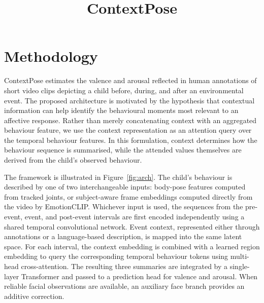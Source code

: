 \documentclass[11pt]{article}
\title{ContextPose}
\author{}
\date{}
\begin{document}
\maketitle

\section{Methodology}
\label{sec:method}

ContextPose estimates the valence and arousal reflected in human annotations of short video clips depicting a child before, during, and after an environmental event. The proposed architecture is motivated by the hypothesis that contextual information can help identify the behavioural moments most relevant to an affective response. Rather than merely concatenating context with an aggregated behaviour feature, we use the context representation as an attention query over the temporal behaviour features. In this formulation, context determines how the behaviour sequence is summarised, while the attended values themselves are derived from the child's observed behaviour.

The framework is illustrated in Figure~\ref{fig:arch}. The child's behaviour is described by one of two interchangeable inputs: body-pose features computed from tracked joints, or subject-aware frame embeddings computed directly from the video by EmotionCLIP. Whichever input is used, the sequences from the pre-event, event, and post-event intervals are first encoded independently using a shared temporal convolutional network. Event context, represented either through annotations or a language-based description, is mapped into the same latent space. For each interval, the context embedding is combined with a learned region embedding to query the corresponding temporal behaviour tokens using multi-head cross-attention. The resulting three summaries are integrated by a single-layer Transformer and passed to a prediction head for valence and arousal. When reliable facial observations are available, an auxiliary face branch provides an additive correction.
\end{document}

